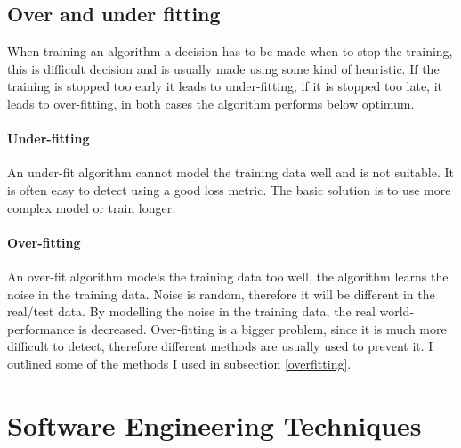 \documentclass[12pt,a4paper]{book}
\begin{document}
\subsection{Over and under fitting}
When training an algorithm a decision has to be made when to stop the training, this is difficult decision and is usually made using some kind of heuristic.
If the training is stopped too early it leads to under-fitting, if it is stopped too late, it leads to over-fitting, in both cases the algorithm performs below optimum.
\paragraph{Under-fitting}
An under-fit algorithm cannot model the training data well and is not suitable.
It is often easy to detect using a good loss metric.
The basic solution is to use more complex model or train longer.
\paragraph{Over-fitting}
An over-fit algorithm models the training data too well, the algorithm learns the noise in the training data.
Noise is random, therefore it will be different in the real/test data.
By modelling the noise in the training data, the real world-performance is decreased.
Over-fitting is a bigger problem, since it is much more difficult to detect, therefore different methods are usually used to prevent it.
I outlined some of the methods I used in subsection \ref{overfitting}.
\section{Software Engineering Techniques}
\end{document}
